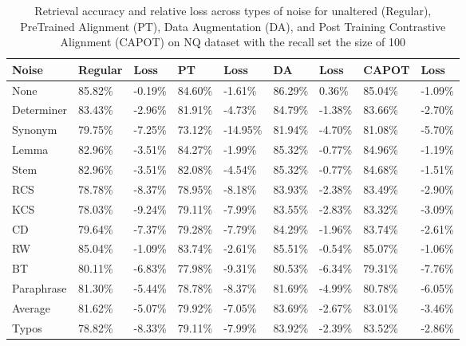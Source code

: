 \begin{table*}[!ht]
    \centering
    \begin{tabular}{|l|l|l|l|l|l|l|l|l|}
    \hline
        Noise & Regular & Loss & PT & Loss & DA & Loss & CAPOT & Loss \\ \hline
        None & 85.82\% & -0.19\% & 84.60\% & -1.61\% & 86.29\% & 0.36\% & 85.04\% & -1.09\% \\ \hline
        Determiner & 83.43\% & -2.96\% & 81.91\% & -4.73\% & 84.79\% & -1.38\% & 83.66\% & -2.70\% \\ \hline
        Synonym & 79.75\% & -7.25\% & 73.12\% & -14.95\% & 81.94\% & -4.70\% & 81.08\% & -5.70\% \\ \hline
        Lemma & 82.96\% & -3.51\% & 84.27\% & -1.99\% & 85.32\% & -0.77\% & 84.96\% & -1.19\% \\ \hline
        Stem & 82.96\% & -3.51\% & 82.08\% & -4.54\% & 85.32\% & -0.77\% & 84.68\% & -1.51\% \\ \hline
        RCS & 78.78\% & -8.37\% & 78.95\% & -8.18\% & 83.93\% & -2.38\% & 83.49\% & -2.90\% \\ \hline
        KCS & 78.03\% & -9.24\% & 79.11\% & -7.99\% & 83.55\% & -2.83\% & 83.32\% & -3.09\% \\ \hline
        CD & 79.64\% & -7.37\% & 79.28\% & -7.79\% & 84.29\% & -1.96\% & 83.74\% & -2.61\% \\ \hline
        RW & 85.04\% & -1.09\% & 83.74\% & -2.61\% & 85.51\% & -0.54\% & 85.07\% & -1.06\% \\ \hline
        BT & 80.11\% & -6.83\% & 77.98\% & -9.31\% & 80.53\% & -6.34\% & 79.31\% & -7.76\% \\ \hline
        Paraphrase & 81.30\% & -5.44\% & 78.78\% & -8.37\% & 81.69\% & -4.99\% & 80.78\% & -6.05\% \\ \hline
        Average & 81.62\% & -5.07\% & 79.92\% & -7.05\% & 83.69\% & -2.67\% & 83.01\% & -3.46\% \\ \hline
        Typos & 78.82\% & -8.33\% & 79.11\% & -7.99\% & 83.92\% & -2.39\% & 83.52\% & -2.86\% \\ \hline
    \end{tabular}
    \caption{Retrieval accuracy and relative loss across types of noise for unaltered (Regular), PreTrained Alignment (PT),  Data Augmentation (DA), and Post Training Contrastive Alignment (CAPOT) on NQ dataset with the recall set the size of 100}
    \label{tab:capot-nq-100}
\end{table*}

